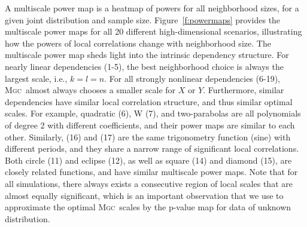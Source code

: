 \documentclass[11pt]{article}
\providecommand{\sct}[1]{{\normalfont\textsc{#1}}}
\newcommand{\Mgc}{\sct{Mgc}}
\begin{document}
A multiscale power map is a heatmap of powers for all neighborhood sizes, for a given joint distribution and sample size.
Figure~\ref{f:powermaps} provides the multiscale power maps for all 20 different high-dimensional scenarios, illustrating how the powers of local correlations change with  neighborhood size.
% 
The multiscale power map sheds light into the intrinsic dependency structure.
For nearly linear dependencies (1-5), the best neighborhood choice is always the largest scale, i.e., $k=l=n$. For all strongly nonlinear dependencies (6-19), \Mgc~almost always chooses a smaller scale for $X$ or $Y$.
Furthermore, similar dependencies have similar local correlation structure, and thus similar optimal scales. For example, quadratic (6),  W (7), and two-parabolas are all polynomials of degree 2 with different coefficients, and their power maps are  similar to each other. Similarly,  (16) and (17) are the same trigonometry function (sine) with different periods, and they share a narrow range of significant local correlations.
Both circle (11) and eclipse (12), as well as square (14) and diamond (15), are closely related functions, and have similar multiscale power maps.
% 
Note that for all simulations, there always exists a  consecutive region of local scales that are almost equally significant, which is an important observation that we use to approximate the optimal \Mgc~scales by the p-value map for data of unknown distribution.
\end{document}
